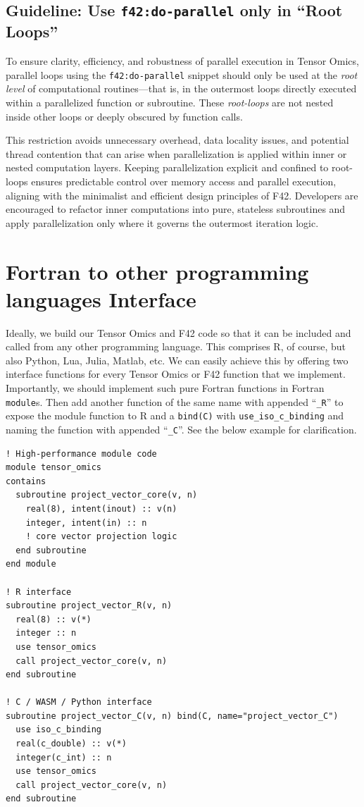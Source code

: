\documentclass{article}
\begin{document}
\subsection{Guideline: Use \texttt{f42:do-parallel} only in ``Root Loops''}

To ensure clarity, efficiency, and robustness of parallel execution in Tensor
Omics, parallel loops using the \texttt{f42:do-parallel} snippet should only be
used at the \emph{root level} of computational routines—that is, in the
outermost loops directly executed within a parallelized function or subroutine.
These \emph{root-loops} are not nested inside other loops or deeply obscured by
function calls.

This restriction avoids unnecessary overhead, data locality issues, and
potential thread contention that can arise when parallelization is applied
within inner or nested computation layers. Keeping parallelization explicit and
confined to root-loops ensures predictable control over memory access and
parallel execution, aligning with the minimalist and efficient design
principles of F42. Developers are encouraged to refactor inner computations
into pure, stateless subroutines and apply parallelization only where it
governs the outermost iteration logic.

\section{Fortran to other programming languages Interface}

Ideally, we build our Tensor Omics and F42 code so that it can be included and
called from any other programming language. This comprises R, of course, but
also Python, Lua, Julia, Matlab, etc. We can easily achieve this by offering
two interface functions for every Tensor Omics or F42 function that we
implement. Importantly, we should implement such pure Fortran functions in
Fortran \texttt{module}s. Then add another function of the same name with
appended ``\texttt{\_R}'' to expose the module function to R and a
\texttt{bind(C)} with \texttt{use\_iso\_c\_binding} and naming the function
with appended ``\texttt{\_C}''. See the below example for clarification.

\begin{verbatim}
! High-performance module code
module tensor_omics
contains
  subroutine project_vector_core(v, n)
    real(8), intent(inout) :: v(n)
    integer, intent(in) :: n
    ! core vector projection logic
  end subroutine
end module

! R interface
subroutine project_vector_R(v, n)
  real(8) :: v(*)
  integer :: n
  use tensor_omics
  call project_vector_core(v, n)
end subroutine

! C / WASM / Python interface
subroutine project_vector_C(v, n) bind(C, name="project_vector_C")
  use iso_c_binding
  real(c_double) :: v(*)
  integer(c_int) :: n
  use tensor_omics
  call project_vector_core(v, n)
end subroutine
\end{verbatim}
\end{document}

